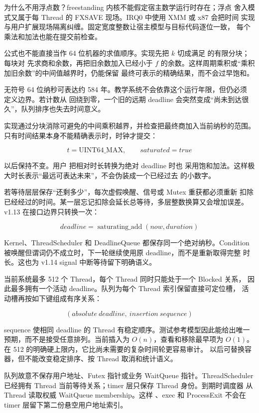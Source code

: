 为什么不用浮点数？freestanding 内核不能假定宿主数学运行时存在；浮点
舍入模式又属于每 Thread 的 FXSAVE 现场。IRQ0 中使用 XMM 或 x87 会把时间
实现与用户扩展现场隔离纠缠。固定宽度整数让宿主模型与目标代码逐位一致，
每个乘法和加法也能在提交前检查。

公式也不能直接当作 64 位机器的求值顺序。实现先把 \(k\) 切成满足
 的有限分块；每块对
 先求商和余数，再把旧余数加入已经小于
\(f\) 的余数。这样周期乘积或“乘积加旧余数”的中间值越界时，仍能保留
最终可表示的精确结果，而不会过早饱和。

无符号 64 位纳秒可表达约 584 年。教学系统不会依靠这个运行年限，但仍必须
定义边界。若计数从  回绕到零，一个旧的远期 deadline
会突然变成“尚未到达很久”，队列排序也失去时间意义。

实现通过分块消除可避免的中间乘积越界，并检查把最终商加入当前纳秒的范围。
只有时间结果本身不能精确表示时，时钟才提交：

\[
t=\mathrm{UINT64\_MAX},\qquad saturated=true
\]

以后保持不变。用户  把相对时长转换为绝对 deadline 时也
采用饱和加法。这样极大时长表示“最远可表达未来”，不会伪装成一个已经过去
的小数字。

若等待层层保存“还剩多少”，每次虚假唤醒、信号或 Mutex 重获都必须重新
扣除已经经过的时间。某一层忘记扣除会延长总等待，多层整数换算又会增加误差。
v1.13 在接口边界只转换一次：

\[
deadline=\operatorname{saturating\_add}(now,duration)
\]

Kernel、ThreadScheduler 和 DeadlineQueue 都保存同一个绝对纳秒。Condition
被唤醒但谓词仍不成立时，下一轮继续使用原 deadline，而不是重新取得完整
时长。这也为 v1.14 signal 中断等待留下明确语义。

当前系统最多 512 个 Thread，每个 Thread 同时只能处于一个 Blocked 关系，
因此最多拥有一个活动 deadline。队列为每个 Thread 索引保留直接可定位槽，
活动槽再按如下键组成有序关系：

\[
(absolute\ deadline,\ insertion\ sequence)
\]

sequence 使相同 deadline 的 Thread 有稳定顺序。测试参考模型因此能给出唯一
预期，而不是接受任意排列。当前插入为 \(O(n)\)，查看和移除最早项为
\(O(1)\)。在 512 的明确硬上限内，它比尚未需要的复杂时间轮更容易审计。
以后可替换容器，但不能改变稳定排序、按 Thread 取消和统计语义。

队列故意不保存用户地址、Futex 指针或业务 WaitQueue 指针。ThreadScheduler
已经拥有 Thread 当前等待关系；timer 层只保存 Thread 身份。到期时调度器
从 Thread 读取权威 WaitQueue membership。这样 、exec 和
ProcessExit 不会在 timer 层留下第二份悬空用户地址索引。


